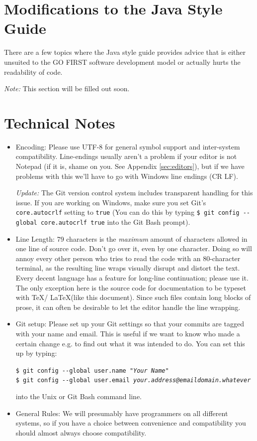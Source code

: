 \documentclass[12pt]{article}
\newcommand{\var}[1]{\texttt{#1}}
\newcommand{\commandline}[1]{\texttt{\$ #1}}
\newcommand{\clloption}[1]{-{}-#1}
\newcommand{\toreplace}[1]{\emph{#1}}
\begin{document}
\section{Modifications to the Java Style Guide}
There are a few topics where the Java style guide provides advice that is either unsuited to the GO FIRST software development model or actually hurts the readability of code.

\emph{Note:} This section will be filled out soon.

\section{Technical Notes}
\begin{itemize}
    \item Encoding: Please use UTF-8 for general symbol support and inter-system compatibility. Line-endings usually aren't a problem if your editor is not Notepad (if it is, shame on you. See Appendix \ref{sec:editors}), but if we have problems with this we'll have to go with Windows line endings (CR LF).

        \emph{Update:} The Git version control system includes transparent handling for this issue. If you are working on Windows, make sure you set Git's \var{core.autocrlf} setting to \var{true} (You can do this by typing \commandline{git config \clloption{global} core.autocrlf true} into the Git Bash prompt).
    \item Line Length: 79 characters is the \emph{maximum} amount of characters allowed in one line of source code. Don't go over it, even by one character. Doing so will annoy every other person who tries to read the code with an 80-character terminal, as the resulting line wraps visually disrupt and distort the text. Every decent language has a feature for long-line continuation; please use it. \\
        The only exception here is the source code for documentation to be typeset with \TeX / \LaTeX (like this document). Since such files contain long blocks of prose, it can often be desirable to let the editor handle the line wrapping.
    \item Git setup: Please set up your Git settings so that your commits are tagged with your name and email. This is useful if we want to know who made a certain change e.g. to find out what it was intended to do. You can set this up by typing:

        \commandline{git config \clloption{global} user.name "\toreplace{Your Name}"}\\
        \commandline{git config \clloption{global} user.email \toreplace{your.address@emaildomain.whatever}}

    into the Unix or Git Bash command line.
    \item General Rules: We will presumably have programmers on all different systems, so if you have a choice between convenience and compatibility you should almost always choose compatibility.

\end{itemize}
\end{document}
